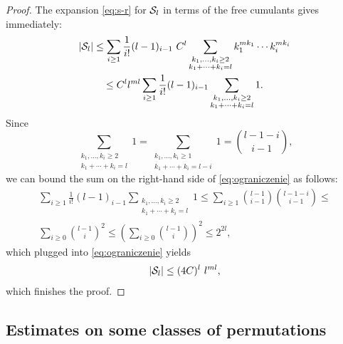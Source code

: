 \documentclass[12pt,usenames,dvipsnames,svgnames,table]{amsart}
\begin{document}
\begin{proof}
	The expansion \eqref{eq:s-r} for $\mathcal{S}_l$ in terms of the free cumulants gives immediately:
	\begin{multline} 
	\label{eq:ograniczenie}
	|\mathcal{S}_l| \leq \sum_{i\geq 1} \frac{1}{i!}  (l-1)_{i-1}\  
	C^l\sum_{\substack{k_1,\dots,k_i\geq 2 \\ k_1+\cdots+k_i=l }} k_1^{m k_1} \cdots
	k_i^{m k_i} \\
	\leq C^l l^{ml}\sum_{i\geq 1} \frac{1}{i!}  (l-1)_{i-1}
	\sum_{\substack{k_1,\dots,k_i\geq 2 \\ k_1+\cdots+k_i=l }}1.
	\end{multline}
	Since
	\[ \sum_{\substack{k_1,\dots,k_i\geq 2 \\ k_1+\cdots+k_i=l }}1 =
	\sum_{\substack{k_1,\dots,k_i\geq 1 \\ k_1+\cdots+k_i=l-i
	}}1=\binom{l-1-i}{i-1},\]
	we can bound the sum on the right-hand side of \eqref{eq:ograniczenie} as follows:
	\begin{multline*} 
	\sum_{i\geq 1} \frac{1}{i!}  (l-1)_{i-1}
	\sum_{\substack{k_1,\dots,k_i\geq 2 \\ k_1+\cdots+k_i=l }} 1 \leq
	\sum_{i\geq 1}\binom{l-1}{i-1}\binom{l-1-i}{i-1} \leq \\
	\sum_{i\geq
		0}\binom{l-1}{i}^2 
	\leq \left(\sum_{i\geq 0}\binom{l-1}{i}\right)^2\leq 2^{2l},
	\end{multline*}
	which plugged into \eqref{eq:ograniczenie} yields
	\[ |\mathcal{S}_l| \leq (4C)^l\ l^{ml},\]
	which finishes the proof.
\end{proof}

\subsection{Estimates on some classes of permutations}
\end{document}
